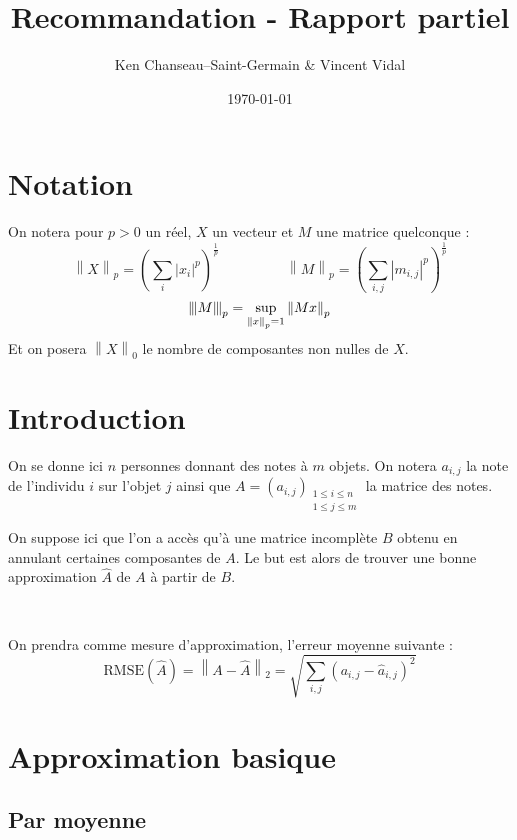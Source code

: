 \documentclass[12pt, a4paper]{article}
\newcommand{\B}{B} %
\newcommand{\Ap}{\widehat{A}} %
\newcommand{\Ac}[2]{a_{#1,#2}} %
\newcommand{\Apc}[2]{\widehat{a}_{#1,#2}} %
\newcommand{\rmse}[1]{\mathrm{RMSE}\pp{#1}} %
\newcommand{\norme}[2]{\left\lVert #1 \right\rVert_{#2}} %
\newcommand{\tnorme}[2]{\left|\hspace{-1pt}\left\lVert #1 \right\rVert\hspace{-1pt}\right|_{#2}} %
\newcommand{\pp}[1]{\left(#1\right)} %
\newcommand{\sdl}{

~

} %
\begin{document}
\title{Recommandation - Rapport partiel}
\author{Ken Chanseau--Saint-Germain \& Vincent Vidal}
\date{\today}
\maketitle

\tableofcontents

\section*{Notation}
On notera pour $p>0$ un réel, $X$ un vecteur et $M$ une matrice quelconque : \[
	\norme{X}{p} = \pp{\sum_i \left|x_i\right|^p}^{\frac{1}{p}} \hspace{2cm} 
	\norme{M}{p} = \pp{\sum_{i, j} \left|m_{i,j}\right|^p}^{\frac{1}{p}}
\]\[
	\tnorme{M}{p} = \sup_{\norme{x}{p}=1} \norme{Mx}{p}
\]
Et on posera $\norme{X}{0}$ le nombre de composantes non nulles de $X$. 

\newpage
\section{Introduction}

On se donne ici $n$ personnes donnant des notes à $m$ objets.\newline
On notera $\Ac{i}{j}$ la note de l'individu $i$ sur l'objet $j$ ainsi que $A = \pp{\Ac{i}{j}}_{\substack{1\leq i\leq n \\ 1 \leq j \leq m}}$ la matrice des notes.

On suppose ici que l'on a accès qu'à une matrice incomplète $\B$ obtenu en annulant certaines composantes de $A$. Le but est alors de trouver une bonne approximation $\Ap$ de $A$ à partir de $\B$.

\sdl

On prendra comme mesure d'approximation, l'erreur moyenne suivante :
\[
	\rmse{\Ap} = \norme{A-\Ap}{2} = \sqrt{\sum_{i,j} \pp{\Ac{i}{j} - \Apc{i}{j}}^2}
\]

\section{Approximation basique}
\subsection{Par moyenne}
\end{document}
